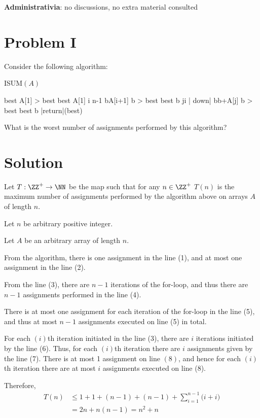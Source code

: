\documentclass[11pt]{scrartcl}
\begin{document}
\NumberProgramstrue
\textbf{Administrativia}: no discussions, no extra material consulted
\section*{Problem I}
Consider the following algorithm:

ISUM$(A)$
\begin{program}
  best 
  \IF A[1] > best \THEN best \gets A[1] \FI
    \FOR i \TO n-1 \DO
    b\gets A[i+1]
    \IF b > best \THEN best \gets b \FI
    \FOR j\gets i | down|  \DO
    b\gets b+A[j]
    \IF b > best \THEN best \gets b \FI
    \OD
    \OD
    |return|(best)
\end{program}

What is the worst number of assignments performed by this algorithm?

\section*{Solution}

Let $T:\ZZ^+ \to \NN$ be the map such that for any $n\in\ZZ^{+}$
$T(n)$ is the maximum number of assignments performed by the algorithm
above on arrays $A$ of length $n$.

Let $n$ be arbitrary positive integer.

Let $A$ be an arbitrary array of length $n$.

From the algorithm, there is one assignment in the line (1), and at
most one assignment in the line (2).

From the line (3), there are $n-1$ iterations of the for-loop, and
thus there are $n-1$ assignments performed in the line (4).

There is at most one assignment for each iteration of the for-loop in
the line (5), and thus at most $n-1$ assignments executed on line (5)
in total.

For each $(i)$th iteration initiated in the line (3), there are $i$
iterations initiated by the line (6). Thus, for each $(i)$th iteration
there are $i$ assignments given by the line (7). There is at most
1 assignment on line $(8)$, and hence for each $(i)$th iteration
there are at most $i$ assignments executed on line (8).

Therefore,
\begin{align}
  T(n) &\leq 1 + 1 + (n-1)+(n-1)+ \sum_{i=1}^{n-1}\big(i+i\big)\\
       &=2n +n(n-1) = n^2+n
\end{align}
\end{document}
